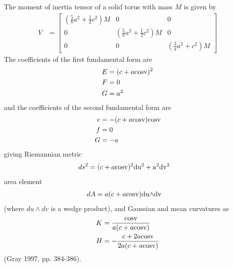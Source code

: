 \documentclass[lang=en,11pt,a4paper,cite=numbers]{elegantpaper}
\begin{document}
  The moment of inertia tensor of a solid torus with mass $M$ is given by
\begin{equation}
  \begin{aligned}
    V&=\begin{bmatrix}
      (\frac{5}{8}a^{2}+\frac{1}{2}c^{2})M & 0 & 0 \\
      0 & (\frac{5}{8}a^{2}+\frac{1}{2}c^{2})M & 0 \\
      0 & 0 & (\frac{3}{4}a^{2}+c^{2})M
    \end{bmatrix}
  \end{aligned}
\end{equation}
The coefficients of the first fundamental form are
\begin{equation}
  \begin{aligned}
    E&=(c+a\rm{cos}v)^{2}\\
    F&=0\\
    G&=a^{2}
  \end{aligned}
\end{equation}
and the coefficients of the second fundamental form are
\begin{equation}
  \begin{aligned}
    e&=-(c+a\rm{cos}v)\rm{cos}v\\
    f&=0\\
    G&=-a
  \end{aligned}
\end{equation}
giving Riemannian metric
\begin{equation}
  \begin{aligned}
    ds^{2}&=(c+a\rm{cos}v)^{2}du^{2}+a^{2}dv^{2}
  \end{aligned}
\end{equation}
area element
\begin{equation}
  \begin{aligned}
    dA&=a(c+a\rm{cos}v)du{\land}dv
  \end{aligned}
\end{equation}
(where $du{\land}dv$ is a wedge product), and Gaussian and mean curvatures as
\begin{equation}
  \begin{aligned}
    K&=\frac{\rm{cos}v}{a(c+a\rm{cos}v)}\\
    H&=-\frac{c+2a\rm{cos}v}{2a(c+a\rm{cos}v)}
  \end{aligned}
\end{equation}
(Gray 1997, pp. 384-386).
\end{document}
